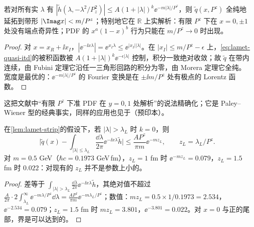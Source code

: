 \begin{lemma}\label{lem:lamet-strip}
若对所有实 $\lambda$ 有 $|\tilde h(\lambda,-\lambda^2/P_z^2)|\le A(1+|\lambda|)^k\ee^{-m|\lambda|/P^z}$，则 $\tilde q(x,P^z)$ 全纯地延拓到带形 $|\Imag x|<m/P^z$；特别地它在 $\mathbb R$ 上实解析：有限 $P^z$ 下在 $x=0,\pm1$ 处没有端点奇异性；PDF 的 $x^a(1-x)^b$ 行为只能在 $m/P^z\to0$ 时出现。%
\end{lemma}

\begin{proof}
对 $x=x_R+\ii x_I$，$|\ee^{-\ii x\lambda}|=\ee^{x_I\lambda}\le\ee^{|x_I||\lambda|}$。在 $|x_I|\le m/P^z-\epsilon$ 上，\cref{eq:lamet-quasi-itd}的被积函数被 $A(1+|\lambda|)^k\ee^{-\epsilon|\lambda|}$ 控制，积分一致绝对收敛；故 $\tilde q$ 在带内连续，由 Fubini 定理它沿任一三角形回路的积分为零，由 Morera 定理它全纯。宽度是最优的：$\ee^{-m|\lambda|/P^z}$ 的 Fourier 变换是在 $\pm\ii m/P^z$ 处有极点的 Lorentz 函数。
\end{proof}

这把文献\cite{Ji:2024oka}中“有限 $P^z$ 下准 PDF 在 $y=0,1$ 处解析”的说法精确化；它是 Paley--Wiener 型的经典事实，同样的应用也见于\cite{Monahan:2026skv}（预印本）。

\begin{proposition}\label{prop:lamet-truncation}
在\cref{lem:lamet-strip}的假设下，若 $|\lambda|>\lambda_L$ 时 $k=0$，则
\begin{equation}\label{eq:lamet-truncation}
\Big|\tilde q(x)-\int_{|\lambda|\le\lambda_L}\frac{\dd\lambda}{2\pi}\ee^{-\ii x\lambda}\tilde h\Big|\le\frac{AP^z}{\pi m}\ee^{-mz_L},\qquad z_L=\lambda_L/P^z .
\end{equation}%
对 $m=0.5$ GeV（$\hbar c=0.1973$ GeV\,fm），$z_L=1$ fm 时 $\ee^{-mz_L}=0.079$，$z_L=1.5$ fm 时 $0.022$：对现有的 $z_L$ 并不是参数上小的。
\end{proposition}

\begin{proof}
差等于 $\int_{|\lambda|>\lambda_L}\frac{\dd\lambda}{2\pi}\ee^{-\ii x\lambda}\tilde h$，其绝对值不超过 $\frac A{2\pi}\cdot2\int_{\lambda_L}^\infty\ee^{-m\lambda/P^z}\dd\lambda=\frac{AP^z}{\pi m}\ee^{-m\lambda_L/P^z}$；数值：$mz_L=0.5\times1/0.1973=2.534$，$\ee^{-2.534}=0.079$；$z_L=1.5$ fm 时 $mz_L=3.801$，$\ee^{-3.801}=0.022$。对 $x=0$ 与正的尾部，界是可以达到的。
\end{proof}


